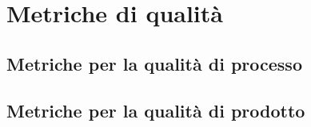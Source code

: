 \section{Metriche di qualità}
\subsection{Metriche per la qualità di processo}
\subsection{Metriche per la qualità di prodotto}

